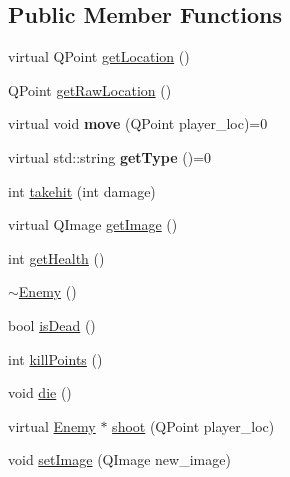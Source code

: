 \subsection*{Public Member Functions}
\begin{DoxyCompactItemize}
\item 
virtual QPoint \hyperlink{classEnemy_adbd413cb01c5dc1ce1c4f8ac8cd5c8fc}{getLocation} ()
\item 
QPoint \hyperlink{classEnemy_a3ccfd3839c3dd8a18e2ba8c68832d0b0}{getRawLocation} ()
\item 
\hypertarget{classEnemy_a70af8aa3f0c0d050265f6d2f5f3cf4db}{
virtual void {\bfseries move} (QPoint player\_\-loc)=0}
\label{classEnemy_a70af8aa3f0c0d050265f6d2f5f3cf4db}

\item 
\hypertarget{classEnemy_a46cc31007a1b13edce61f2ef041ba425}{
virtual std::string {\bfseries getType} ()=0}
\label{classEnemy_a46cc31007a1b13edce61f2ef041ba425}

\item 
int \hyperlink{classEnemy_af1468155f753afc9a17c30c348a3353f}{takehit} (int damage)
\item 
virtual QImage \hyperlink{classEnemy_afa324ecdbc88a1e7a4b8e5e2ab44d4df}{getImage} ()
\item 
int \hyperlink{classEnemy_a46341636350ca2bc6aac929b2a84f215}{getHealth} ()
\item 
\hyperlink{classEnemy_ac0eec4755e28c02688065f9657150ac3}{$\sim$Enemy} ()
\item 
bool \hyperlink{classEnemy_a038e636d16b708f92627348a36750702}{isDead} ()
\item 
int \hyperlink{classEnemy_acfbb6534b831828741eff8cf69d16417}{killPoints} ()
\item 
void \hyperlink{classEnemy_a04c451624958712b36546037fc25c601}{die} ()
\item 
virtual \hyperlink{classEnemy}{Enemy} $\ast$ \hyperlink{classEnemy_ae672ccf745ec7fc74f9eb5d2001828d2}{shoot} (QPoint player\_\-loc)
\item 
void \hyperlink{classEnemy_a60ed7bf392ed7a5bcdae46a7f4935715}{setImage} (QImage new\_\-image)
\end{DoxyCompactItemize}
